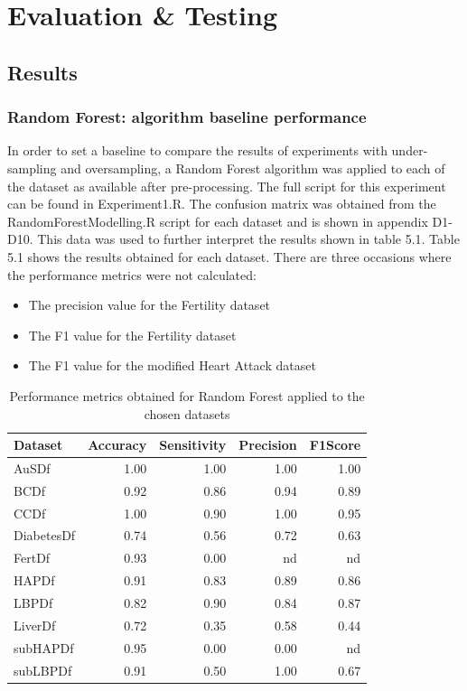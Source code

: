 \chapter{Evaluation \& Testing}\label{ch:Evaluation}
\section{Results}
\subsection{Random Forest: algorithm baseline performance}
In order to set a baseline to compare the results of experiments with under-sampling and oversampling, a Random Forest algorithm was applied to each of the dataset as available after pre-processing. The full script for this experiment can be found in Experiment1.R.\newline
The confusion matrix was obtained from the RandomForestModelling.R script for each dataset and is shown in appendix D1-D10. This data was used to further interpret the results shown in table 5.1.\newline
Table 5.1 shows the results obtained for each dataset. There are three occasions where the performance metrics were not calculated:
\begin{itemize}
    \item The precision value for the Fertility dataset
    \item The F1 value for the Fertility dataset
    \item The F1 value for the modified Heart Attack dataset
\end{itemize}

\begin{table}[!htbp]
\centering
\begin{tabular}{lrrrr}
  \hline
  \rowcolor{LightCyan}
Dataset & Accuracy & Sensitivity & Precision & F1Score \\ 
  \hline
AuSDf & 1.00 & 1.00 & 1.00 & 1.00 \\ 
  BCDf & 0.92 & 0.86 & 0.94 & 0.89 \\ 
  CCDf & 1.00 & 0.90 & 1.00 & 0.95 \\ 
  DiabetesDf & 0.74 & 0.56 & 0.72 & 0.63 \\ 
  FertDf & 0.93 & 0.00 & nd & nd \\ 
  HAPDf & 0.91 & 0.83 & 0.89 & 0.86 \\ 
  LBPDf & 0.82 & 0.90 & 0.84 & 0.87 \\ 
  LiverDf & 0.72 & 0.35 & 0.58 & 0.44 \\ 
  subHAPDf & 0.95 & 0.00 & 0.00 & nd \\ 
  subLBPDf & 0.91 & 0.50 & 1.00 & 0.67 \\ 
   \hline
\end{tabular}
\caption{Performance metrics obtained for Random Forest applied to the chosen datasets}
\label{tab:RfMetrics}
\end{table}

